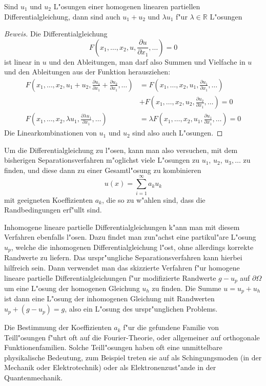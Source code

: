 \begin{satz}Sind $u_1$ und $u_2$ L"osungen einer homogenen linearen partiellen
Differentialgleichung, dann sind auch $u_1+u_2$ und $\lambda u_1$ f"ur
$\lambda\in\mathbb R$ L"osungen
\end{satz}

\begin{proof}[Beweis]
Die Differentialgleichung
\[
F(x_1,\dots,x_2,u,\frac{\partial u}{\partial x_1},\dots)=0
\]
ist linear in $u$ und den Ableitungen, man darf also Summen und Vielfache
in $u$ und den Ableitungen aus der Funktion herausziehen:
\begin{align*}
F(x_1,\dots,x_2,u_1+u_2,\frac{\partial u_1}{\partial x_1}+\frac{\partial u_2}{\partial x_1},\dots)
&=
F(x_1,\dots,x_2,u_1,\frac{\partial u_1}{\partial x_1},\dots)
\\
&+
F(x_1,\dots,x_2,u_2,\frac{\partial u_2}{\partial x_1},\dots)=0
\\
F(x_1,\dots,x_2,\lambda u_1,\frac{\partial \lambda u_1}{\partial x_1},\dots)
&=
\lambda
F(x_1,\dots,x_2,u_1,\frac{\partial u_1}{\partial x_1},\dots)
=0
\end{align*}
Die Linearkombinationen von $u_1$ und $u_2$ sind also auch L"osungen.
\end{proof}

Um die Differentialgleichung zu l"osen, kann man also versuchen, mit
dem bisherigen Separationsverfahren m"oglichst viele L"osungen zu
$u_1$, $u_2$, $u_3,\dots$ zu finden, und diese dann zu einer Gesamtl"osung
zu kombinieren
\[
u(x)=\sum_{i=1}^\infty a_ku_k
\]
mit geeigneten Koeffizienten $a_k$, die so zu w"ahlen sind, dass die
Randbedingungen erf"ullt sind.

Inhomogene lineare partielle Differentialgleichungen k"ann man mit diesem
Verfahren ebenfalls l"osen. Dazu findet man zun"achst eine partikul"are
L"osung $u_p$, welche die inhomogenen Differentialgleichung l"ost, ohne
allerdings korrekte Randwerte zu liefern.
Das urspr"ungliche Separationsverfahren kann hierbei hilfreich sein.
Dann verwendet man das skizzierte Verfahren f"ur homogene lineare
partielle Differentialgleichungen f"ur modifizierte Randwerte $g-u_p$ auf
$\partial\Omega$ um eine L"osung der homogenen Gleichung $u_h$ zu finden.
Die Summe $u=u_p+u_h$ ist dann eine L"osung der inhomogenen Gleichung
mit Randwerten $u_p + (g-u_p)=g$, also ein L"osung des urspr"unglichen
Problems.

Die Bestimmung der Koeffizienten $a_k$ f"ur die gefundene Familie
von Teill"osungen f"uhrt oft auf die Fourier-Theorie, oder allgemeiner
auf orthogonale Funktionenfamilien. Solche Teill"osungen haben oft eine
unmittelbare physikalische Bedeutung, zum Beispiel treten sie auf als
Schingungsmoden (in der Mechanik oder Elektrotechnik) oder als
Elektronenzust"ande in der Quantenmechanik.

